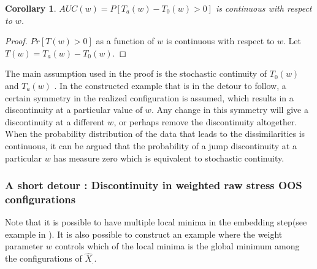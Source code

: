 \documentclass[11pt]{article} %
\newtheorem{cor}{Corollary}
\begin{document}
\begin{cor}{
 $AUC(w)=P\left[T_a(w)-T_0(w) >0 \right]$ is continuous with respect to $w$.}
\end{cor}
\begin{proof}
 $Pr\left[T(w)>0 \right]$  as a function of $w$ is continuous with respect to $w$.  Let $T(w)=T_a(w)-T_0(w)$.
\end{proof}


The main assumption  used in the proof is the stochastic continuity of $T_0(w)$ and $T_a(w)$ .  In the constructed example that is in the detour to follow,  a certain symmetry in the realized configuration is assumed, which results in a discontinuity at a particular  value of $w$. Any change in this symmetry will give a discontinuity at a different $w$, or perhaps remove the discontinuity altogether. When the probability distribution of the data that leads to the dissimilarities is continuous, it can be argued that the probability of a  jump discontinuity at  a particular $w$ has measure zero which is equivalent to stochastic continuity.

\subsubsection{ A short detour : Discontinuity in weighted raw stress OOS configurations\label{subsubsec:Discontinuity}}

Note that it is possible to have multiple local minima in the embedding step(see example in \cite{TrossetLocalMin}). It is also possible to construct an example  where the weight parameter $w$ controls which of the local minima is the global minimum among the configurations of $\hat{X}_{.}$.

\end{document}
